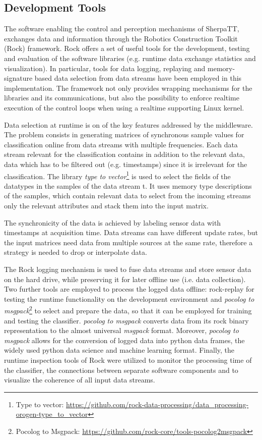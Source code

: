 \documentclass{article}
\begin{document}
\subsection{Development Tools}

The software enabling the control and perception mechanisms of SherpaTT, exchanges data and information through the Robotics Construction Toolkit (Rock) framework. Rock offers a set of useful tools for the development, testing and evaluation of the software libraries (e.g. runtime data exchange statistics and visualization). In particular, tools for data logging, replaying and memory-signature based data selection from data streams have been employed in this implementation. The framework not only provides wrapping mechanisms for the libraries and its communications, but also the possibility to enforce realtime execution of the control loops when using a realtime supporting Linux kernel. 

Data selection at runtime is on of the key features addressed by the middleware. 
The problem consists in generating matrices of synchronous sample values for classification online from data streams with multiple frequencies.
Each data stream relevant for the classification contains in addition to the relevant data, data which has to be filtered out (e.g. timestamps) since it is irrelevant for the classification.
The library \emph{type to vector}\footnote{Type to vector: \url{https://github.com/rock-data-processing/data_processing-orogen-type_to_vector}} is used
to select the fields of the datatypes in the samples of the data stream t. It uses memory type descriptions of the samples, which contain relevant data to select from the incoming streams only the relevant attributes and stack them into the input matrix. 

The synchronicity of the data is achieved by labeling sensor data with timestamps at acquisition time.
Data streams can have different update rates, but the input matrices need data from multiple sources at the same rate, therefore a strategy is needed to drop or interpolate data. 

The Rock logging mechanism is used to fuse data streams and store sensor data on the hard drive, while preserving it for later offline use (i.e. data collection). 
Two further tools are employed to process the logged data offline: rock-replay for testing the runtime functionality on the development environment and \emph{pocolog to msgpack}\footnote{Pocolog to Msgpack: \url{https://github.com/rock-core/tools-pocolog2msgpack}} to select and prepare the data, so that it can be employed for training and testing the classifier.
\emph{pocolog to msgpack} converts data from its rock binary representation to the almost universal \emph{msgpack} format.
Moreover, \emph{pocolog to msgpack} allows for the conversion of logged data into python data frames, the widely used python data science and machine learning format. 
Finally, the runtime inspection tools of Rock were utilized to monitor the processing time of the classifier, the connections between separate software components and to visualize the coherence of all input data streams. 
\end{document}

